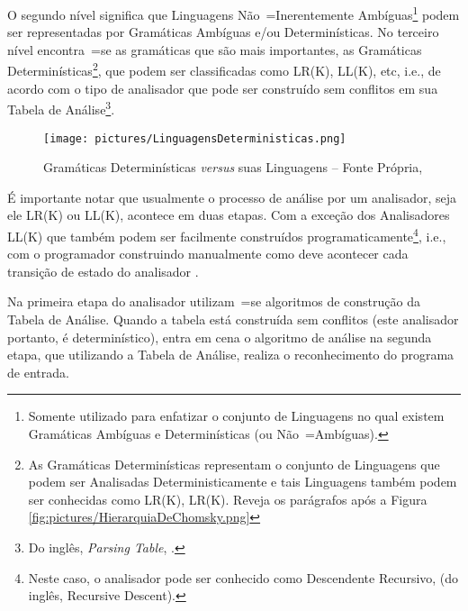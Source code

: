 {    O segundo nível significa que Linguagens Não~=Inerentemente Ambíguas\footnote{
    Somente utilizado para enfatizar o conjunto de Linguagens no qual existem Gramáticas Ambíguas e
    Determinísticas (ou Não~=Ambíguas).
    }
    podem ser representadas por Gramáticas Ambíguas e\slash{}ou Determinísticas.
    No terceiro nível encontra~=se as gramáticas que são mais importantes,
    as Gramáticas Determinísticas\footnote{
    As Gramáticas Determinísticas representam o conjunto de Linguagens que podem ser Analisadas Deterministicamente e
    tais Linguagens também podem ser conhecidas como LR(K),
    LR(K).
    Reveja os parágrafos após a Figura \ref{fig:pictures/HierarquiaDeChomsky.png}
    },
    que podem ser classificadas como LR(K),
    LL(K), etc, i.e.,
    de acordo com o tipo de analisador que pode ser construído sem conflitos em sua Tabela de Análise\footnote{
    Do inglês, \textit{Parsing Table},
    \cite{ahoCompilerDragonBook}.
    }.
    \begin{figure}[h]
    \centering
    \texttt{[image: pictures/LinguagensDeterministicas.png]}
    \caption[Gramáticas Determinísticas \textit{versus} suas Linguagens]{Gramáticas Determinísticas \textit{versus} suas Linguagens -- Fonte Própria,
    }
    \label{fig:pictures/LinguagensDeterministicas.png}
    \end{figure}

    É importante notar que usualmente o processo de análise por um analisador,
    seja ele LR(K) ou
    LL(K),
    acontece em duas etapas.
    Com a exceção dos Analisadores LL(K) que também podem ser facilmente construídos programaticamente\footnote{
    Neste caso,
    o analisador pode ser conhecido como Descendente Recursivo,
    (do inglês,
    Recursive Descent).
    },
    i.e.,
    com o programador construindo manualmente como deve acontecer cada transição de estado do analisador \cite{ahoCompilerDragonBook}.

    Na primeira etapa do analisador utilizam~=se algoritmos de construção da Tabela de Análise.
    Quando a tabela está construída sem conflitos (este analisador portanto,
    é determinístico),
    entra em cena o algoritmo de análise na segunda etapa,
    que utilizando a Tabela de Análise,
    realiza o reconhecimento do programa de entrada.

}
